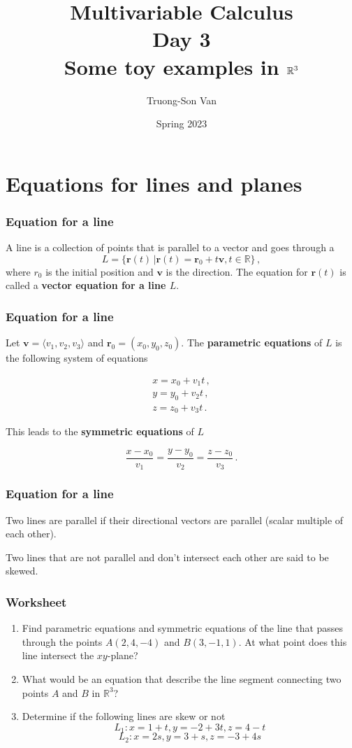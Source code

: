 \documentclass[aspectratio=169]{beamer}
\title{ Multivariable Calculus \\ Day 3 \\ Some toy examples in $\R^3$}
\institute{Fulbright University Vietnam}
\author{Truong-Son Van}
\date{Spring 2023}
\newcommand{\vect}{\mathbf}
\newcommand{\R}{\mathbb{R}}
\begin{document}
\maketitle

\section{Equations for lines and planes}

\begin{frame}
    \frametitle{Equation for a line}
A line is a collection of points that is parallel to a vector and goes through a 
\begin{equation*}
    L = \{\vect{r}(t) \,|  \vect{r}(t) = \vect{r}_0 + t \vect{v}, t\in \R \}  \,,
\end{equation*}
where ${r}_0$ is the initial position and $\vect{v}$ is the direction.
The equation for $\vect{r}(t)$ is called a \textbf{vector equation for a line $L$}.
\end{frame}

\begin{frame}
    \frametitle{Equation for a line}
Let $\vect{v} = \langle v_1, v_2, v_3 \rangle$ and $\vect{r}_0 = ( x_0, y_0, z_0 )$.
The \textbf{parametric equations} of $L$ is the following system of equations

\begin{gather*}
    x = x_0 + v_1 t\,, \\
    y = y_0 + v_2 t\,, \\
    z = z_0 + v_3 t \,. 
\end{gather*}

This leads to the \textbf{symmetric equations} of $L$

\begin{equation*}
    \frac{x - x_0}{v_1} = \frac{y - y_0}{v_2} = \frac{z - z_0}{v_3} \,.
\end{equation*}
\end{frame}

\begin{frame}
    \frametitle{Equation for a line}
    Two lines are parallel if their directional vectors are parallel (scalar multiple of each other).

    Two lines that are not parallel and don't intersect each other are said to be skewed.
\end{frame}

\begin{frame}
    \frametitle{Worksheet}
    \begin{enumerate}
                \item Find parametric equations and symmetric equations of the line that passes 
    through the points $A(2,4,-4)$ and $B(3,-1,1)$.
         At what point does this line intersect the $xy$-plane?
        \item What would be an equation that describe the line segment 
            connecting two points $A$ and $B$ in $\R^3$?
        \item Determine if the following lines are skew or not
            $$L_1: x= 1 +t, y = -2 + 3t, z= 4-t$$
            $$ L_2: x = 2s, y = 3+s, z= -3 + 4s$$
    \end{enumerate}
\end{frame}
\end{document}

